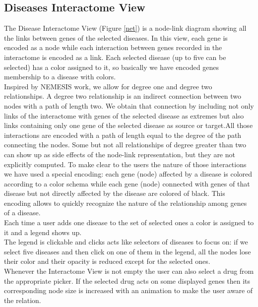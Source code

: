 \documentclass[12pt,twocolumn,twoside]{article}
\begin{document}
	\subsection*{Diseases Interactome View}
	The Disease Interactome View (Figure \ref{net}) is a node-link diagram showing all the links between genes of the selected diseases. In this view, each gene is encoded as a node while each interaction between genes recorded in the interactome is encoded as a link. Each selected disease (up to five can be selected) has a color assigned to it, so basically we have encoded genes membership to a disease with colors.\\
	Inspired by NEMESIS\cite{ivapp19} work, we allow for degree one and degree two relationships. A degree two relationship is an indirect connection between two nodes with a path of length two. We obtain that connection by including not only links of the interactome with genes of the selected disease as extremes but also links containing only one gene of the selected disease as source or target.\newline All those interactions are encoded with a path of length equal to the degree of the path connecting the nodes. Some but not all relationships of degree greater than two can show up as side effects of the node-link representation, but they are not explicitly computed. To make clear to the users the nature of those interactions we have used a special encoding: each gene (node) affected by a disease is colored according to a color schema while each gene (node) connected with genes of that disease but not directly affected by the disease are colored of black.  This encoding allows to quickly recognize the nature of the relationship among genes of a disease.\\ 
	Each time a user adds one disease to the set of selected ones a color is assigned to it and a legend shows up.\\ The legend is clickable and clicks acts like selectors of diseases to focus on: if we select five diseases and then click on one of them in the legend, all the nodes lose their color and their opacity is reduced except for the selected ones. \\
	Whenever the Interactome View is not empty the user can also select a drug from the appropriate picker. If the selected drug acts on some displayed genes then its corresponding node size is increased with an animation to make the user aware of the relation.\\
\end{document}
